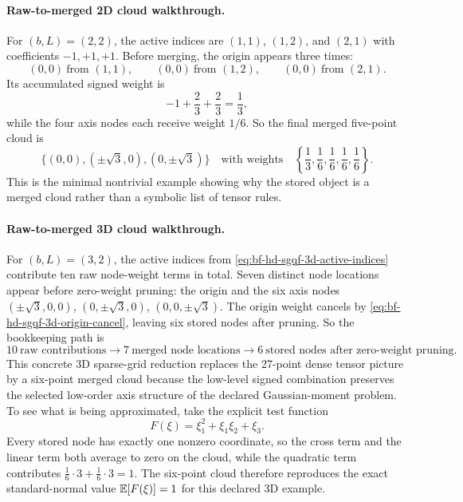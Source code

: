 \paragraph{Raw-to-merged 2D cloud walkthrough.}
For \((b,L)=(2,2)\), the active indices are \((1,1)\), \((1,2)\), and
\((2,1)\) with coefficients \(-1,+1,+1\).  Before merging, the origin appears
three times:
\begin{equation}
  (0,0)\ \text{from }(1,1),
  \qquad
  (0,0)\ \text{from }(1,2),
  \qquad
  (0,0)\ \text{from }(2,1).
  \label{eq:bf-hd-sgqf-2d-origin-repeat}
\end{equation}
Its accumulated signed weight is
\begin{equation}
  -1+\frac23+\frac23=\frac13,
  \label{eq:bf-hd-sgqf-2d-origin-accum}
\end{equation}
while the four axis nodes each receive weight \(1/6\).  So the final merged
five-point cloud is
\begin{equation}
  \{(0,0),(\pm\sqrt3,0),(0,\pm\sqrt3)\}
  \quad\text{with weights}\quad
  \left\{\frac13,\frac16,\frac16,\frac16,\frac16\right\}.
  \label{eq:bf-hd-sgqf-2d-merged-cloud}
\end{equation}
This is the minimal nontrivial example showing why the stored object is a merged
cloud rather than a symbolic list of tensor rules.

\paragraph{Raw-to-merged 3D cloud walkthrough.}
For \((b,L)=(3,2)\), the active indices from
\eqref{eq:bf-hd-sgqf-3d-active-indices} contribute ten raw node-weight terms in
total.  Seven distinct node locations appear before zero-weight pruning: the
origin and the six axis nodes \((\pm\sqrt3,0,0)\), \((0,\pm\sqrt3,0)\),
\((0,0,\pm\sqrt3)\).  The origin weight cancels by
\eqref{eq:bf-hd-sgqf-3d-origin-cancel}, leaving six stored nodes after pruning.
So the bookkeeping path is
\begin{equation}
  10\ \text{raw contributions}
  \longrightarrow
  7\ \text{merged node locations}
  \longrightarrow
  6\ \text{stored nodes after zero-weight pruning}.
  \label{eq:bf-hd-sgqf-3d-merge-counts}
\end{equation}
This concrete 3D sparse-grid reduction replaces the 27-point dense tensor
picture by a six-point merged cloud because the low-level signed combination
preserves the selected low-order axis structure of the declared Gaussian-moment
problem.  To see what is being approximated, take the explicit test function
\begin{equation}
  F(\xi)=\xi_1^2+\xi_1\xi_2+\xi_3 .
  \label{eq:bf-hd-sgqf-3d-test-function}
\end{equation}
Every stored node has exactly one nonzero coordinate, so the cross term and the
linear term both average to zero on the cloud, while the quadratic term
contributes $\tfrac16\cdot3+\tfrac16\cdot3=1$.  The six-point cloud therefore
reproduces the exact standard-normal value $\mathbb{E}[F(\xi)]=1$ for this declared 3D
example.


